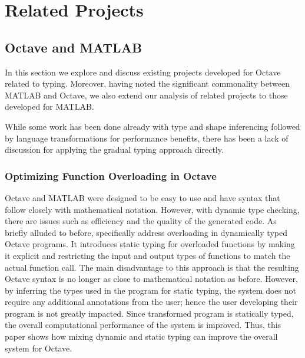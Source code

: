 \section{Related Projects}
\subsection{Octave and MATLAB}
 In this section we explore and discuss existing projects developed for Octave related to typing. Moreover, having noted the significant commonality between MATLAB and Octave, we also extend our analysis of related projects to those developed for MATLAB.
 
 While some work has been done already with type and shape inferencing followed by language transformations for performance benefits, there has been a lack of discussion for applying the gradual typing approach directly.

\subsubsection{Optimizing Function Overloading in Octave}
Octave and MATLAB were designed to be easy to use and have syntax that follow closely with mathematical notation. However, with dynamic type checking, there are issues such as efficiency and the quality of the generated code. As briefly alluded to before, \citet{olmos2003turning} specifically address overloading in dynamically typed Octave programs. It introduces static typing for overloaded functions by making it explicit and restricting the input and output types of functions to match the actual function call. The main disadvantage to this approach is that the resulting Octave syntax is no longer as close to mathematical notation as before. However, by inferring the types used in the program for static typing, the system does not require any additional annotations from the user; hence the user developing their program is not greatly impacted. Since transformed program is statically typed, the overall computational performance of the system is improved. Thus, this paper shows how mixing dynamic and static typing can improve the overall system for Octave.

